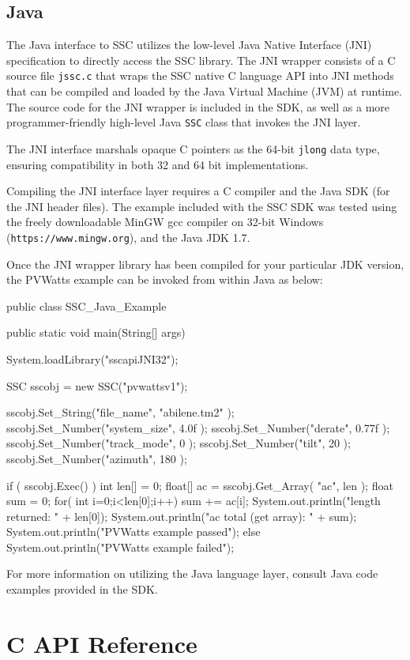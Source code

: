 \documentclass{article}
\begin{document}
\subsection{Java}

The Java interface to SSC utilizes the low-level Java Native Interface (JNI) specification to directly access the SSC library.  The JNI wrapper consists of a C source file \texttt{jssc.c} that wraps the SSC native C language API into JNI methods that can be compiled and loaded by the Java Virtual Machine (JVM) at runtime.  The source code for the JNI wrapper is included in the SDK, as well as a more programmer-friendly high-level Java \texttt{SSC} class that invokes the JNI layer.

The JNI interface marshals opaque C pointers as the 64-bit \texttt{jlong} data type, ensuring compatibility in both 32 and 64 bit implementations.

Compiling the JNI interface layer requires a C compiler and the Java SDK (for the JNI header files).  The example included with the SSC SDK was tested using the freely downloadable MinGW gcc compiler on 32-bit Windows (\texttt{https://www.mingw.org}), and the Java JDK 1.7.  

Once the JNI wrapper library has been compiled for your particular JDK version, the PVWatts example can be invoked from within Java as below:

\begin{verbatimtab}[4]

public class SSC_Java_Example {
   
    public static void main(String[] args)
    {
        System.loadLibrary("sscapiJNI32");
		
        SSC sscobj = new SSC("pvwattsv1");

        sscobj.Set_String("file_name", "abilene.tm2" );
        sscobj.Set_Number("system_size", 4.0f );
        sscobj.Set_Number("derate", 0.77f );
        sscobj.Set_Number("track_mode", 0 );
        sscobj.Set_Number("tilt", 20 );
        sscobj.Set_Number("azimuth", 180 );
        
		if ( sscobj.Exec() )
        {
            int len[] = {0};
            float[] ac = sscobj.Get_Array( "ac", len );
            float sum = 0;
            for( int i=0;i<len[0];i++)
            {
                sum += ac[i];
            }
            System.out.println("length returned: " + len[0]);
            System.out.println("ac total (get array): " + sum);
            System.out.println("PVWatts example passed");
        }
        else
        {
            System.out.println("PVWatts example failed");
        }
    }    
}

\end{verbatimtab}

For more information on utilizing the Java language layer, consult Java code examples provided in the SDK.


\section{C API Reference}
\label{sec_api_ref}

\end{document}
